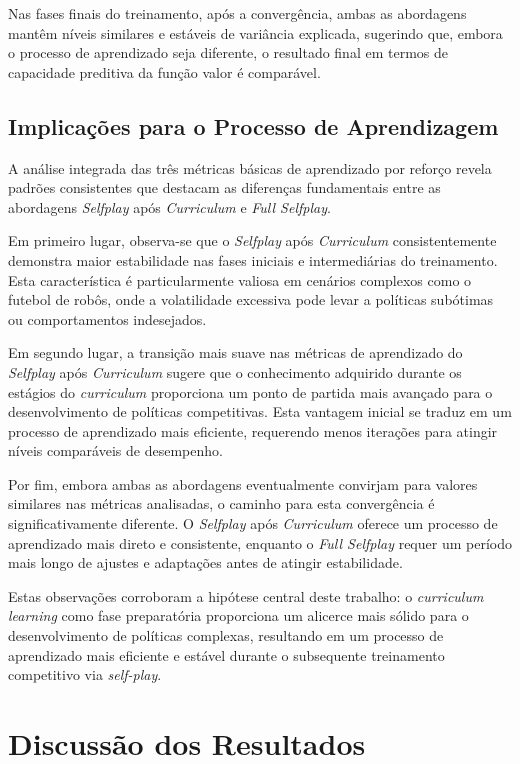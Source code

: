 Nas fases finais do treinamento, após a convergência, ambas as abordagens mantêm níveis similares e estáveis de variância explicada, sugerindo que, embora o processo de aprendizado seja diferente, o resultado final em termos de capacidade preditiva da função valor é comparável.

\subsection{Implicações para o Processo de Aprendizagem}

A análise integrada das três métricas básicas de aprendizado por reforço revela padrões consistentes que destacam as diferenças fundamentais entre as abordagens \textit{Selfplay} após \textit{Curriculum} e \textit{Full Selfplay}.

Em primeiro lugar, observa-se que o \textit{Selfplay} após \textit{Curriculum} consistentemente demonstra maior estabilidade nas fases iniciais e intermediárias do treinamento. Esta característica é particularmente valiosa em cenários complexos como o futebol de robôs, onde a volatilidade excessiva pode levar a políticas subótimas ou comportamentos indesejados.

Em segundo lugar, a transição mais suave nas métricas de aprendizado do \textit{Selfplay} após \textit{Curriculum} sugere que o conhecimento adquirido durante os estágios do \textit{curriculum} proporciona um ponto de partida mais avançado para o desenvolvimento de políticas competitivas. Esta vantagem inicial se traduz em um processo de aprendizado mais eficiente, requerendo menos iterações para atingir níveis comparáveis de desempenho.

Por fim, embora ambas as abordagens eventualmente convirjam para valores similares nas métricas analisadas, o caminho para esta convergência é significativamente diferente. O \textit{Selfplay} após \textit{Curriculum} oferece um processo de aprendizado mais direto e consistente, enquanto o \textit{Full Selfplay} requer um período mais longo de ajustes e adaptações antes de atingir estabilidade.

Estas observações corroboram a hipótese central deste trabalho: o \textit{curriculum learning} como fase preparatória proporciona um alicerce mais sólido para o desenvolvimento de políticas complexas, resultando em um processo de aprendizado mais eficiente e estável durante o subsequente treinamento competitivo via \textit{self-play}.

\section{Discussão dos Resultados}
\label{sec:discussao_resultados}

